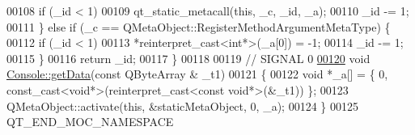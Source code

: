 \begin{DoxyCode}
00108         \textcolor{keywordflow}{if} (\_id < 1)
00109             qt\_static\_metacall(\textcolor{keyword}{this}, \_c, \_id, \_a);
00110         \_id -= 1;
00111     \} \textcolor{keywordflow}{else} \textcolor{keywordflow}{if} (\_c == QMetaObject::RegisterMethodArgumentMetaType) \{
00112         \textcolor{keywordflow}{if} (\_id < 1)
00113             *\textcolor{keyword}{reinterpret\_cast<}\textcolor{keywordtype}{int}*\textcolor{keyword}{>}(\_a[0]) = -1;
00114         \_id -= 1;
00115     \}
00116     \textcolor{keywordflow}{return} \_id;
00117 \}
00118 
00119 \textcolor{comment}{// SIGNAL 0}
\hypertarget{a00064_source_l00120}{}\hyperlink{a00005_a1976aad46ce1a77be730bc628275038f}{00120} \textcolor{keywordtype}{void} \hyperlink{a00005_a1976aad46ce1a77be730bc628275038f}{Console::getData}(\textcolor{keyword}{const} QByteArray & \_t1)
00121 \{
00122     \textcolor{keywordtype}{void} *\_a[] = \{ 0, \textcolor{keyword}{const\_cast<}\textcolor{keywordtype}{void}*\textcolor{keyword}{>}(\textcolor{keyword}{reinterpret\_cast<}\textcolor{keyword}{const }\textcolor{keywordtype}{void}*\textcolor{keyword}{>}(&\_t1)) \};
00123     QMetaObject::activate(\textcolor{keyword}{this}, &staticMetaObject, 0, \_a);
00124 \}
00125 QT\_END\_MOC\_NAMESPACE
\end{DoxyCode}
